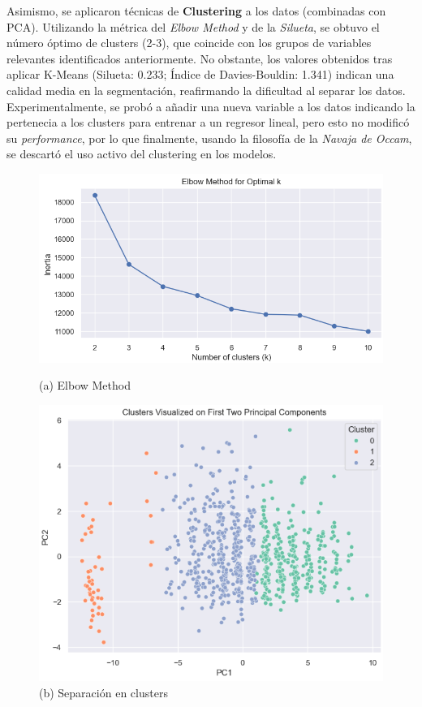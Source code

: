 \documentclass{article}
\begin{document}
Asimismo, se aplicaron técnicas de \textbf{Clustering} a los datos (combinadas con PCA). Utilizando la métrica del \textit{Elbow Method} y de la \textit{Silueta}, se obtuvo el número óptimo de clusters (2-3), que coincide con los grupos de variables relevantes identificados anteriormente. No obstante, los valores obtenidos tras aplicar K-Means (Silueta: 0.233; Índice de Davies-Bouldin: 1.341) indican una calidad media en la segmentación, reafirmando la dificultad al separar los datos. 
Experimentalmente, se probó a añadir una nueva variable a los datos indicando la pertenecia a los clusters para entrenar a un regresor lineal, pero esto no modificó su \textit{performance}, por lo que finalmente, usando la filosofía de la \textit{Navaja de Occam},
se descartó el uso activo del clustering en los modelos.

\begin{figure}[h!]
  \centering
  \begin{minipage}[b]{0.45\textwidth}
      \centering
      \includegraphics[scale=0.40]{Elbow_Method.png}
      \caption{(a) Elbow Method}
  \end{minipage}
  \hfill
  \begin{minipage}[b]{0.45\textwidth}
      \centering
      \includegraphics[scale=0.4]{Clusters.png}
      \caption{(b) Separación en clusters}
  \end{minipage}
\end{figure}
\end{document}
